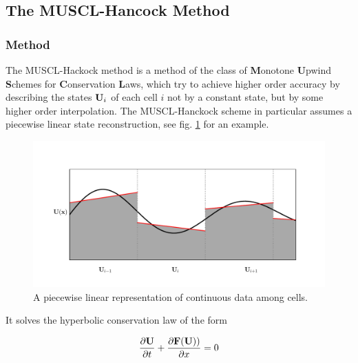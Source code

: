 \subsection{The MUSCL-Hancock Method} \label{chap:MUSCL-hancock}











\subsubsection{Method}

The MUSCL-Hackock method is a method of the class of \textbf{M}onotone \textbf{U}pwind \textbf{S}chemes for \textbf{C}onservation \textbf{L}aws, which try to achieve higher order accuracy by describing the states $\mathbf{U}_i$ of each cell $i$ not by a constant state, but by some higher order interpolation.
The MUSCL-Hanckock scheme in particular assumes a piecewise linear state reconstruction, see fig. \ref{fig:piecewise-linear} for an example.


\begin{figure}[H]
	\includegraphics[width=\textwidth]{./figures/piecewise_linear.pdf}%
	\caption{	
		A piecewise linear representation of continuous data among cells.
		\label{fig:piecewise-linear}
		}
\end{figure}


It solves the hyperbolic conservation law of the form

\begin{equation*}
	\frac{\partial \mathbf{U}}{\partial t} + \frac{\partial \mathbf{F}(\mathbf{U}))}{\partial x} = 0
\end{equation*}

